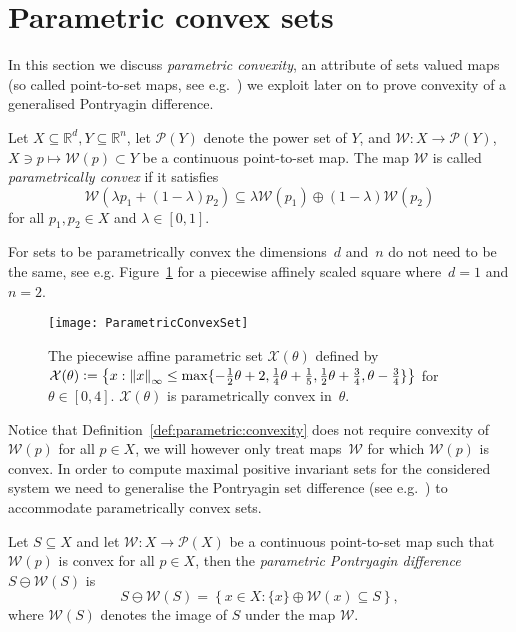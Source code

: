 \section{Parametric convex sets}\label{sec:parametric:convex:sets}
In this section we discuss \emph{parametric convexity}, an attribute of sets valued maps
(so called point-to-set maps, see e.g.~\cite{Hogan:1973}) we exploit later on to prove 
convexity of a generalised Pontryagin difference.
%
\begin{defn}\label{def:parametric:convexity}
	Let $X\subseteq\mathbb R^d, Y\subseteq\mathbb R^n$, let $\mathcal P(Y)$ denote the power set of $Y$, 
	and $\mathcal W:X\rightarrow \mathcal P(Y)$, $X\ni p\mapsto \mathcal W(p)\subset Y$ be a 
	continuous point-to-set map. The map $\mathcal W$ is called \emph{parametrically convex} if it satisfies
	\begin{equation}\label{eq:def:parametrically:convex}
	\mathcal W(\lambda p_1 + (1-\lambda)p_2)\subseteq\lambda \mathcal W(p_1) \oplus (1-\lambda) \mathcal W(p_2)
	\end{equation}
	for all $p_1,p_2\in X$ and $\lambda\in[0,1]$.
\end{defn}
%
For sets to be parametrically convex the dimensions~$d$ and~$n$ do not need to be the same, see e.g.
Figure~\ref{fig:parametrically:convex:set} for a piecewise affinely scaled square where~$d=1$ and $n=2$.
%
\begin{figure}
\centering
\texttt{[image: ParametricConvexSet]}
\caption[A parametrically convex set.]{The piecewise affine parametric set $\mathcal X(\theta)$ 
defined by $\mathcal X(\theta)\mathrel{\mathop:}=\left\{x:\left\|x\right\|_\infty\leq\max\{-\frac{1}{2}
\theta+2,\frac{1}{4}\theta+\frac{1}{5},\frac{1}{2}\theta+\frac{3}{4},\theta-\frac{3}{4}\}\right\}$ 
for $\theta\in[0,4]$. $\mathcal X(\theta)$ is parametrically convex in~$\theta$.}
\label{fig:parametrically:convex:set}
\end{figure}
%
Notice that Definition~\ref{def:parametric:convexity} does not require convexity of~$\mathcal W(p)$ for all
$p\in X$, we will however only treat maps~$\mathcal W$ for which $\mathcal W(p)$ is convex.
%
In order to compute maximal positive invariant sets for the considered system we need to generalise
the Pontryagin set difference (see e.g.~\cite{blanchini:2007}) to accommodate parametrically convex sets.
%
\begin{defn}\label{def:parametric:pontryagin:difference}
	Let $S\subseteq X$ and let $\mathcal W:X\to\mathcal P(X)$ be a continuous point-to-set map such that
	$\mathcal W(p)$ is convex for all $p\in X$, then the \emph{parametric Pontryagin difference} 
	$S\ominus \mathcal W(S)$ is 
	\begin{equation}\label{eq:definition:parametric:pontryagin:difference}
		S\ominus \mathcal W(S) = \left\{x\in X: \{x\} \oplus \mathcal W(x)\subseteq S\right\},
	\end{equation}
	where $\mathcal W(S)$ denotes the image of $S$ under the map $\mathcal W$. 
\end{defn}
